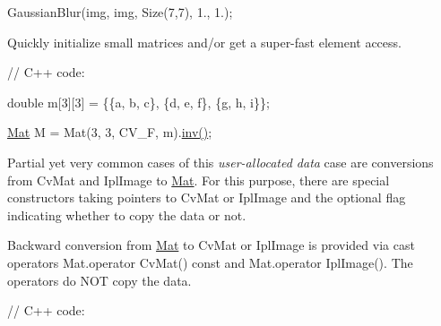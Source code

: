 {\ttfamily }

{\ttfamily Gaussian\+Blur(img, img, Size(7,7), 1., 1.);}

{\ttfamily }

{\ttfamily }

{\ttfamily }


\begin{DoxyItemize}
\item Quickly initialize small matrices and/or get a super-\/fast element access. 
\end{DoxyItemize}

{\ttfamily }

{\ttfamily }

{\ttfamily }

{\ttfamily // C++ code\+:}

{\ttfamily }

{\ttfamily }

{\ttfamily double m\mbox{[}3\mbox{]}\mbox{[}3\mbox{]} = \{\{a, b, c\}, \{d, e, f\}, \{g, h, i\}\};}

{\ttfamily }

{\ttfamily }

{\ttfamily \mbox{\hyperlink{classorg_1_1opencv_1_1core_1_1_mat}{Mat}} M = Mat(3, 3, C\+V\+\_\+F, m).\mbox{\hyperlink{classorg_1_1opencv_1_1core_1_1_mat_a3ae81a587a404aa8b3751af8c0763515}{inv()}};}

{\ttfamily }

{\ttfamily }

{\ttfamily }

Partial yet very common cases of this {\itshape user-\/allocated data} case are conversions from {\ttfamily Cv\+Mat} and {\ttfamily Ipl\+Image} to {\ttfamily \mbox{\hyperlink{classorg_1_1opencv_1_1core_1_1_mat}{Mat}}}. For this purpose, there are special constructors taking pointers to {\ttfamily Cv\+Mat} or {\ttfamily Ipl\+Image} and the optional flag indicating whether to copy the data or not.

Backward conversion from {\ttfamily \mbox{\hyperlink{classorg_1_1opencv_1_1core_1_1_mat}{Mat}}} to {\ttfamily Cv\+Mat} or {\ttfamily Ipl\+Image} is provided via cast operators {\ttfamily Mat.\+operator Cv\+Mat() const} and {\ttfamily Mat.\+operator Ipl\+Image()}. The operators do N\+OT copy the data.

{\ttfamily }

{\ttfamily }

{\ttfamily }

{\ttfamily // C++ code\+:}

